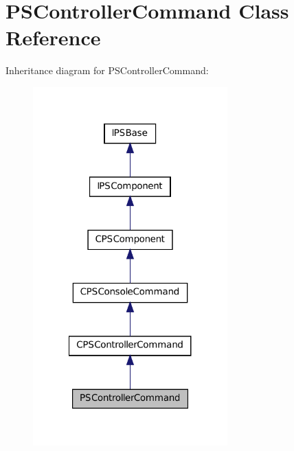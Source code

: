 \hypertarget{classPSControllerCommand}{
\section{PSControllerCommand Class Reference}
\label{classPSControllerCommand}
}


Inheritance diagram for PSControllerCommand:\nopagebreak
\begin{figure}[H]
\begin{center}
\leavevmode
\includegraphics[width=212pt]{classPSControllerCommand__inherit__graph}
\end{center}
\end{figure}


